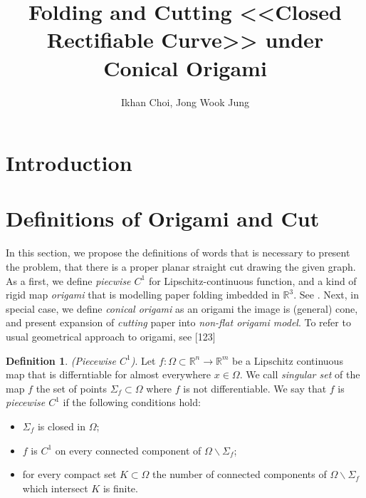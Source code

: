 \documentclass{amsart}
\theoremstyle{plain}
\theoremstyle{definition}
\newtheorem*{definition}{Definition}
\theoremstyle{remark}
\begin{document}
\title[Fold-and-Cut <<Closed Rectifiable Curve>> under Conical Origami]
{Folding and Cutting <<Closed Rectifiable Curve>> under Conical Origami}

\author[I. Choi, J. W. Jung]{Ikhan Choi, Jong Wook Jung}
\address{address}





\begin{abstract}


\end{abstract}



\maketitle

\section{Introduction}











\section{Definitions of Origami and Cut}%

In this section, we propose the definitions of words that is necessary to present the problem, that there is a proper planar straight cut drawing the given graph.
As a first, we define {\it piecwise $C^1$} for Lipschitz-continuous function, and a kind of rigid map {\it origami} that is modelling paper folding imbedded in ${\mathbb R}^3$.
See \cite{Lip}.
Next, in special case, we define {\it conical origami} as an origami the image is (general) cone, and present expansion of {\it cutting} paper into {\it non-flat origami model}.
To refer to usual geometrical approach to origami, see [123] %


\begin{definition}%
{\it (Piecewise $C^1$)}.
Let $f:\Omega\subset{\mathbb R}^n\to{\mathbb R}^m$ be a Lipschitz continuous map that is differntiable for almost everywhere $x\in\Omega$. We call {\it singular set} of the map $f$ the set of points $\Sigma_f\subset\Omega$ where $f$ is not differentiable.
We say that $f$ is {\it piecewise $C^1$} if the following conditions hold:
\begin{itemize}
\item $\Sigma_f$ is closed in $\Omega$;
\item $f$ is $C^1$ on every connected component of $\Omega\backslash\Sigma_f$;
\item for every compact set $K\subset\Omega$ the number of connected components of $\Omega\backslash\Sigma_f$ which intersect $K$ is finite.
\end{itemize}
\end{definition}
\end{document}
